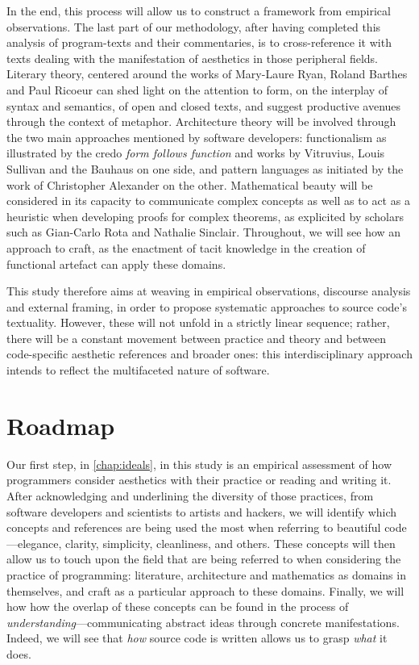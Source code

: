 In the end, this process will allow us to construct a framework from empirical observations. The last part of our methodology, after having completed this analysis of program-texts and their commentaries, is to cross-reference it with texts dealing with the manifestation of aesthetics in those peripheral fields. Literary theory, centered around the works of Mary-Laure Ryan, Roland Barthes and Paul Ricoeur can shed light on the attention to form, on the interplay of syntax and semantics, of open and closed texts, and suggest productive avenues through the context of metaphor. Architecture theory will be involved through the two main approaches mentioned by software developers: functionalism as illustrated by the credo \emph{form follows function} and works by Vitruvius, Louis Sullivan and the Bauhaus on one side, and pattern languages as initiated by the work of Christopher Alexander on the other. Mathematical beauty will be considered in its capacity to communicate complex concepts as well as to act as a heuristic when developing proofs for complex theorems, as explicited by scholars such as Gian-Carlo Rota and Nathalie Sinclair. Throughout, we will see how an approach to craft, as the enactment of tacit knowledge in the creation of functional artefact can apply these domains.

This study therefore aims at weaving in empirical observations, discourse analysis and external framing, in order to propose systematic approaches to source code's textuality. However, these will not unfold in a strictly linear sequence; rather, there will be a constant movement between practice and theory and between code-specific aesthetic references and broader ones: this interdisciplinary approach intends to reflect the multifaceted nature of software.

\section{Roadmap}
\label{sec:roadmap}

Our first step, in \ref{chap:ideals}, in this study is an empirical assessment of how programmers consider aesthetics with their practice or reading and writing it. After acknowledging and underlining the diversity of those practices, from software developers and scientists to artists and hackers, we will identify which concepts and references are being used the most when referring to beautiful code—elegance, clarity, simplicity, cleanliness, and others. These concepts will then allow us to touch upon the field that are being referred to when considering the practice of programming: literature, architecture and mathematics as domains in themselves, and craft as a particular approach to these domains. Finally, we will how how the overlap of these concepts can be found in the process of \emph{understanding}—communicating abstract ideas through concrete manifestations. Indeed, we will see that \emph{how} source code is written allows us to grasp \emph{what} it does.

